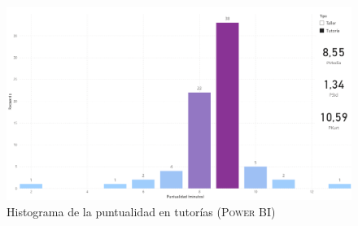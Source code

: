 \documentclass[11pt,a4paper]{book}
\theoremstyle{definition}%
\begin{document}
                \begin{figure}[H]
                    \centering
                    \includegraphics[width=1\textwidth]{Sources/histograma_PuntualidadTutoria.png}
                    \caption{Histograma de la puntualidad en tutorías (\textsc{Power BI})}
                    \label{fig:histograma_PuntualidadTutoria}
                \end{figure}
\end{document}
